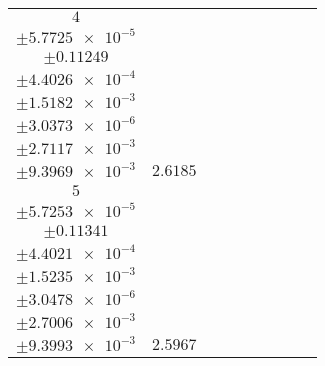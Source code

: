\documentclass[8pt]{article}
\begin{document}
\begin{longtable}[l]{c c c c c c c c c}
$\num{4}$ & \begin{tabular}[c]{@{}c@{}}$\num{2.9888e-2}$ \\ $\pm\num{5.7725e-5}$\end{tabular} & \begin{tabular}[c]{@{}c@{}}$\num{0.17475}$ \\ $\pm\num{0.11249}$\end{tabular} & \begin{tabular}[c]{@{}c@{}}$\num{-2.9568}$ \\ $\pm\num{4.4026e-4}$\end{tabular} & \begin{tabular}[c]{@{}c@{}}$\num{1.1767e+3}$ \\ $\pm\num{1.5182e-3}$\end{tabular} & \begin{tabular}[c]{@{}c@{}}$\num{2.3541}$ \\ $\pm\num{3.0373e-6}$\end{tabular} & \begin{tabular}[c]{@{}c@{}}$\num{1.1533}$ \\ $\pm\num{2.7117e-3}$\end{tabular} & \begin{tabular}[c]{@{}c@{}}$\num{4.1938}$ \\ $\pm\num{9.3969e-3}$\end{tabular} & $\num{2.6185}$\\
$\num{5}$ & \begin{tabular}[c]{@{}c@{}}$\num{2.9531e-2}$ \\ $\pm\num{5.7253e-5}$\end{tabular} & \begin{tabular}[c]{@{}c@{}}$\num{-0.13989}$ \\ $\pm\num{0.11341}$\end{tabular} & \begin{tabular}[c]{@{}c@{}}$\num{2.9564}$ \\ $\pm\num{4.4021e-4}$\end{tabular} & \begin{tabular}[c]{@{}c@{}}$\num{1.1826e+3}$ \\ $\pm\num{1.5235e-3}$\end{tabular} & \begin{tabular}[c]{@{}c@{}}$\num{2.3659}$ \\ $\pm\num{3.0478e-6}$\end{tabular} & \begin{tabular}[c]{@{}c@{}}$\num{1.1422}$ \\ $\pm\num{2.7006e-3}$\end{tabular} & \begin{tabular}[c]{@{}c@{}}$\num{4.1782}$ \\ $\pm\num{9.3993e-3}$\end{tabular} & $\num{2.5967}$\\

\end{longtable}
\end{document}
